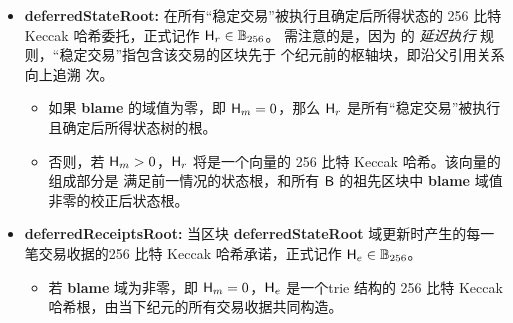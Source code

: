 \begin{itemize}[nosep]
	\item {\bf deferredStateRoot:} 在所有“稳定交易”被执行且确定后所得状态的 256 比特 Keccak 哈希委托，正式记作 $\textsf{H}_r\in\mathbb{B}_{256}$。
	需注意的是，因为 {\name} 的 \emph{延迟执行} 规则，“稳定交易”指包含该交易的区块先于  个纪元前的枢轴块，即沿父引用关系向上追溯  次。
	\begin{itemize}
		\item 如果 {\bf blame} 的域值为零，即 $\textsf{H}_m=0$，那么 $\textsf{H}_r$ 是所有“稳定交易”被执行且确定后所得状态树的根。
	
		\item 否则，若 $\textsf{H}_m>0$，$\textsf{H}_r$ 将是一个向量的 256 比特 Keccak 哈希。该向量的组成部分是 满足前一情况的状态根，和所有 $\textsf{B}$ 的祖先区块中 {\bf blame} 域值非零的校正后状态根。
	\end{itemize}
	
	
	\item {\bf deferredReceiptsRoot:} 当区块 {\bf deferredStateRoot} 域更新时产生的每一笔交易收据的256 比特 Keccak 哈希承诺，正式记作 $\textsf{H}_e\in\mathbb{B}_{256}$。
	\begin{itemize}
		\item 若 {\bf blame} 域为非零，即 $\textsf{H}_m=0$，$\textsf{H}_e$ 是一个trie 结构的 256 比特 Keccak 哈希根，由当下纪元的所有交易收据共同构造。
		

\end{itemize}
\end{itemize}
